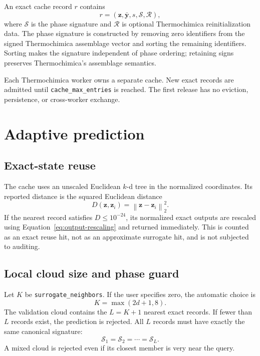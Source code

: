 \documentclass[11pt]{article}
\newcommand{\norm}[1]{\left\lVert #1\right\rVert_2}
\newcommand{\code}[1]{\texttt{#1}}
\begin{document}
An exact cache record $r$ contains
\begin{equation}
  r=\left(\boldsymbol{z},\bar{\boldsymbol{y}},s,
  \mathcal{S},\mathcal{R}\right),
  \label{eq:record}
\end{equation}
where $\mathcal{S}$ is the phase signature and $\mathcal{R}$ is optional Thermochimica
reinitialization data.  The phase signature is constructed by removing zero identifiers from the
signed Thermochimica assemblage vector and sorting the remaining identifiers.  Sorting makes the
signature independent of phase ordering; retaining signs preserves Thermochimica's assemblage
semantics.

Each Thermochimica worker owns a separate cache.  New exact records are admitted until
\code{cache\_max\_entries} is reached.  The first release has no eviction, persistence, or
cross-worker exchange.

\section{Adaptive prediction}

\subsection{Exact-state reuse}

The cache uses an unscaled Euclidean $k$-d tree in the normalized coordinates.  Its reported
distance is the squared Euclidean distance
\begin{equation}
  D(\boldsymbol{z},\boldsymbol{z}_i)=
  \norm{\boldsymbol{z}-\boldsymbol{z}_i}^{2}.
  \label{eq:distance}
\end{equation}
If the nearest record satisfies $D\leq 10^{-24}$, its normalized exact outputs are rescaled using
Equation~\eqref{eq:output-rescaling} and returned immediately.  This is counted as an exact reuse
hit, not as an approximate surrogate hit, and is not subjected to auditing.

\subsection{Local cloud size and phase guard}

Let $K$ be \code{surrogate\_neighbors}.  If the user specifies zero, the automatic choice is
\begin{equation}
  K=\max(2d+1,8).
  \label{eq:auto-k}
\end{equation}
The validation cloud contains the $L=K+1$ nearest exact records.  If fewer than $L$ records exist,
the prediction is rejected.  All $L$ records must have exactly the same canonical signature:
\begin{equation}
  \mathcal{S}_1=\mathcal{S}_2=\cdots=\mathcal{S}_L.
  \label{eq:phase-guard}
\end{equation}
A mixed cloud is rejected even if its closest member is very near the query.
\end{document}
